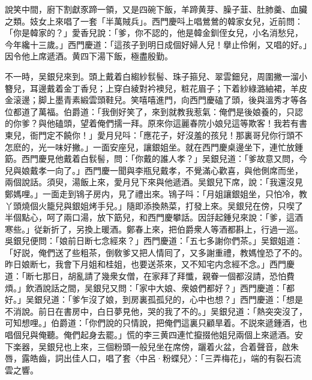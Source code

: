 說笑中間，廚下割獻豕蹄一領，又是四碗下飯，羊蹄黄芽、臊子韮、肚肺羹、血臟之類。妓女上來唱了一套「半萬賊兵」。西門慶呌上唱鶯鶯的韓家女兒，近前問：「你是韓家的？」愛香兒說：「爹，你不認的，他是韓金釧侄女兒，小名消愁兒，今年纔十三歲。」西門慶道：「這孩子到明日成個好婦人兒！擧止伶俐，又唱的好。」因令他上席遞酒。黄四下湯下飯，極盡殷勤。

不一時，吴銀兒來到。頭上戴着白縐紗䯼髻、珠子箍兒、翠雲鈿兒，周圍撇一溜小簪兒，耳邊戴着金丁香兒；上穿白綾對衿襖兒，粧花眉子；下着紗綠潞紬裙，羊皮金滚邊；脚上墨青素緞雲頭鞋兒。笑嘻嘻進門，向西門慶磕了頭，後與溫秀才等各位都道了萬福。伯爵道：「我倒好笑了，來到就教我惹氣：俺們是後娘養的，只認的你爹？與他磕頭，望着俺們擩一拜。原來你這麗春院小娘兒這等欺客！我若有書柬兒，衙門定不饒你！」愛月兒呌：「應花子，好沒羞的孩兒！那裏哥兒你行頭不怎麽的，光一味好撇。」一面安座兒，讓銀姐坐。就在西門慶桌邊坐下，連忙放鍾筯。西門慶見他戴着白䯼髻，問：「你戴的誰人孝？」吴銀兒道：「爹故意又問，今兒與娘戴孝一向了。」西門慶一聞與李瓶兒戴孝，不覺滿心歡喜，與他側席而坐，兩個說話。須臾，湯飯上來，愛月兒下來與他遞酒。吴銀兒下席，說：「我還沒見鄭媽哩。」一面走到鴇子房内，見了禮出來。鴇子呌：「月姐讓銀姐坐，只怕冷，教丫頭燒個火籠兒與銀姐烤手兒。」隨即添換熱菜，打發上來。吴銀兒在傍，只喫了半個點心，呵了兩口湯，放下筯兒，和西門慶攀話。因㧱起鍾兒來說：「爹，這酒寒些。」従新折了，另換上暖酒。鄭春上來，把伯爵衆人等酒都斟上，行過一巡。吳銀兒便問：「娘前日断七念經來？」西門慶道：「五七多謝你們茶。」吴銀姐道：「好説，俺們送了些粗茶，倒敎爹又把人情囘了，又多謝重禮，教媽惶恐了不的。昨日娘断七，我會下月姐和桂姐，也要送茶來，又不知宅内念經不念。」西門慶道：「断七那日，胡亂請了幾衆女僧，在家拜了拜懺，親眷一個都沒請，恐怕費煩。」飲酒說話之間，吴銀兒又問：「家中大娘、衆娘們都好？」西門慶道：「都好。」吴銀兒道：「爹乍沒了娘，到房裏孤孤兒的，心中也想？」西門慶道：「想是不消說。前日在書房中，白日夢見他，哭的我了不的。」吴銀兒道：「熱突突沒了，可知想哩。」伯爵道：「你們說的只情說，把俺們這裏只顧旱着。不説來遞鍾酒，也唱個兒與俺聽。俺們起身去罷。」慌的李三黄四連忙攛掇他姐兒兩個上來遞酒。安下楽器，吴銀兒也上來，三個粉頭一般兒坐在席傍，躧着火盆，合着聲音，啟朱唇，露皓齒，詞出佳人口，唱了套〈中呂·粉蝶兒〉：「三弄梅花」，端的有裂石流雲之響。

